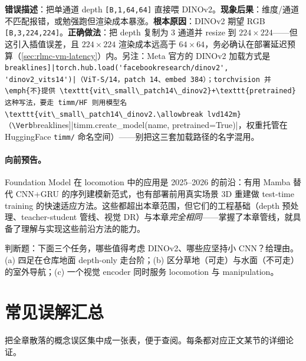 \begin{pitfall}
\textbf{错误描述}：把单通道 depth \verb|[B,1,64,64]| 直接喂 DINOv2。\textbf{现象后果}：维度/通道不匹配报错，或勉强跑但渲染成本暴涨。\textbf{根本原因}：DINOv2 期望 RGB \verb|[B,3,224,224]|。\textbf{正确做法}：把 depth 复制为 $3$ 通道并 resize 到 $224\times224$——但这引入插值误差，且 $224\times224$ 渲染成本远高于 $64\times64$，务必确认在部署延迟预算（\cref{sec:rlmc-vm-latency}）内。另注：Meta 官方的 DINOv2 加载方式是 \Verb[breaklines]|torch.hub.load('facebookresearch/dinov2', 'dinov2_vits14')|（ViT-S/14，patch 14、embed 384）；torchvision 并\emph{不}提供 \texttt{vit\_small\_patch14\_dinov2}+\texttt{pretrained} 这种写法，要走 timm/HF 则用模型名 \texttt{vit\_small\_patch14\_dinov2.\allowbreak lvd142m}（\Verb[breaklines]|timm.create_model(name, pretrained=True)|，权重托管在 HuggingFace \texttt{timm/} 命名空间）——别把这三套加载路径的名字混用。
\end{pitfall}

\paragraph{向前预告。}Foundation Model 在 locomotion 中的应用是 2025--2026 的前沿：有用 Mamba 替代 CNN+GRU 的序列建模新范式，也有部署前用真实场景 3D 重建做 test-time training 的快速适应方法。这些都超出本章范围，但它们的工程基础（depth 预处理、teacher-student 管线、视觉 DR）与本章\emph{完全相同}——掌握了本章管线，就具备了理解与实现这些前沿方法的能力。

\begin{practice}
判断题：下面三个任务，哪些值得考虑 DINOv2、哪些应坚持小 CNN？给理由。(a) 四足在仓库地面 depth-only 走台阶；(b) 区分草地（可走）与水面（不可走）的室外导航；(c) 一个视觉 encoder 同时服务 locomotion 与 manipulation。
\end{practice}

\section{常见误解汇总}
\label{sec:rlmc-vm-myths}

把全章散落的概念误区集中成一张表，便于查阅。每条都对应正文某节的详细论证。

